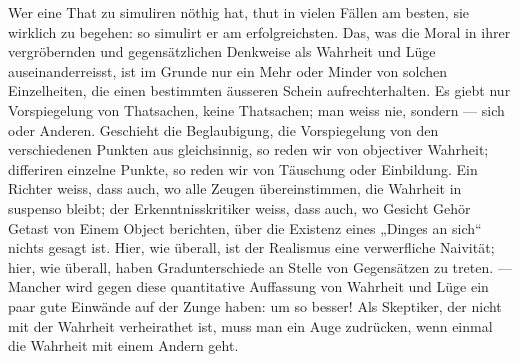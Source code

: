 Wer eine That zu simuliren nöthig hat, thut in vielen Fällen am besten, sie wirklich zu begehen: so simulirt er am erfolgreichsten. Das, was die Moral in ihrer vergröbernden und gegensätzlichen Denkweise als Wahrheit und Lüge auseinanderreisst, ist im Grunde nur ein Mehr oder Minder von solchen Einzelheiten, die einen bestimmten äusseren Schein aufrechterhalten. Es giebt nur Vorspiegelung von Thatsachen, keine Thatsachen; man weiss nie, sondern  — sich oder Anderen. Geschieht die Beglaubigung, die Vorspiegelung von den verschiedenen Punkten aus gleichsinnig, so reden wir von objectiver Wahrheit; differiren einzelne Punkte, so reden wir von Täuschung oder Einbildung. Ein Richter weiss, dass auch, wo alle Zeugen übereinstimmen, die Wahrheit in suspenso bleibt; der Erkenntnisskritiker weiss, dass auch, wo Gesicht Gehör Getast von Einem Object berichten, über die Existenz eines „Dinges an sich“ nichts gesagt ist. Hier, wie überall, ist der Realismus eine verwerfliche Naivität; hier, wie überall, haben Gradunterschiede an Stelle von Gegensätzen zu treten. — Mancher wird gegen diese quantitative Auffassung von Wahrheit und Lüge ein paar gute Einwände auf der Zunge haben: um so besser! Als Skeptiker, der nicht mit der Wahrheit verheirathet ist, muss man ein Auge zudrücken, wenn einmal die Wahrheit mit einem Andern geht.
\par

